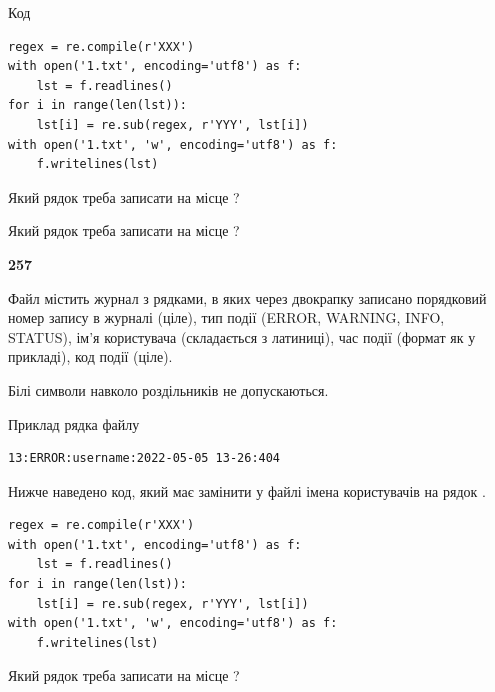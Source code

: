 Код



\begin{verbatim}
regex = re.compile(r'XXX')
with open('1.txt', encoding='utf8') as f:
    lst = f.readlines()
for i in range(len(lst)):
    lst[i] = re.sub(regex, r'YYY', lst[i])
with open('1.txt', 'w', encoding='utf8') as f:
    f.writelines(lst)
\end{verbatim}







Який рядок треба записати на місце  ?\par
\vspace{5mm}


Який рядок треба записати на місце  ?\par


\newpage

{\begin {center}\textbf{ 257}\end {center}}\par
Файл  містить журнал з рядками, в яких через двокрапку записано поряд\-ко\-вий номер запису в журналі (ціле), тип події (ERROR, WARNING, INFO, STATUS), ім'я користувача (складається з латиниці), час події (фор\-мат як у прикладі), код події (ціле).

Білі символи навколо роздільників не допускаються.

Приклад рядка файлу



\begin{verbatim}
13:ERROR:username:2022-05-05 13-26:404
\end{verbatim}


Нижче наведено код, який має замінити у файлі імена користувачів на рядок .



\begin{verbatim}
regex = re.compile(r'XXX')
with open('1.txt', encoding='utf8') as f:
    lst = f.readlines()
for i in range(len(lst)):
    lst[i] = re.sub(regex, r'YYY', lst[i])
with open('1.txt', 'w', encoding='utf8') as f:
    f.writelines(lst)
\end{verbatim}







Який рядок треба записати на місце  ?\par
\vspace{5mm}


